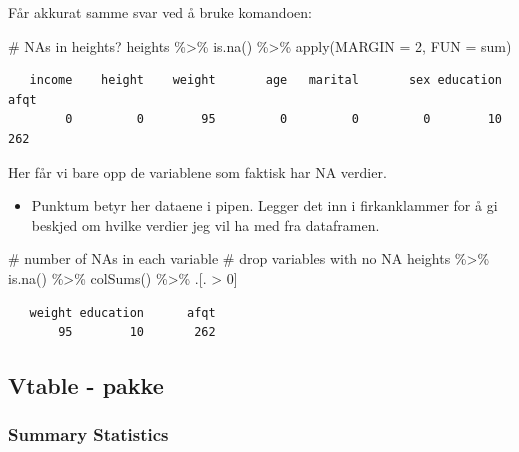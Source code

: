 \documentclass[
  letterpaper,
  DIV=11,
  numbers=noendperiod]{scrartcl}
\newenvironment{Shaded}{\begin{snugshade}}{\end{snugshade}}
\newcommand{\AttributeTok}[1]{\textcolor[rgb]{0.40,0.45,0.13}{#1}}
\newcommand{\CommentTok}[1]{\textcolor[rgb]{0.37,0.37,0.37}{#1}}
\newcommand{\DecValTok}[1]{\textcolor[rgb]{0.68,0.00,0.00}{#1}}
\newcommand{\FunctionTok}[1]{\textcolor[rgb]{0.28,0.35,0.67}{#1}}
\newcommand{\NormalTok}[1]{\textcolor[rgb]{0.00,0.23,0.31}{#1}}
\newcommand{\SpecialCharTok}[1]{\textcolor[rgb]{0.37,0.37,0.37}{#1}}
\providecommand{\tightlist}{%
  \setlength{\itemsep}{0pt}\setlength{\parskip}{0pt}}\usepackage{longtable,booktabs,array}
\begin{document}
Får akkurat samme svar ved å bruke komandoen:

\begin{Shaded}
\begin{Highlighting}[]
\CommentTok{\# NAs in heights?}
\NormalTok{heights }\SpecialCharTok{\%\textgreater{}\%} 
  \FunctionTok{is.na}\NormalTok{() }\SpecialCharTok{\%\textgreater{}\%} 
  \FunctionTok{apply}\NormalTok{(}\AttributeTok{MARGIN =} \DecValTok{2}\NormalTok{, }\AttributeTok{FUN =}\NormalTok{ sum) }
\end{Highlighting}
\end{Shaded}

\begin{verbatim}
   income    height    weight       age   marital       sex education      afqt 
        0         0        95         0         0         0        10       262 
\end{verbatim}

Her får vi bare opp de variablene som faktisk har NA verdier.

\begin{itemize}
\tightlist
\item
  Punktum betyr her dataene i pipen. Legger det inn i firkanklammer for
  å gi beskjed om hvilke verdier jeg vil ha med fra dataframen.
\end{itemize}

\begin{Shaded}
\begin{Highlighting}[]
\CommentTok{\# number of NAs in each variable}
\CommentTok{\# drop variables with no NA}
\NormalTok{heights }\SpecialCharTok{\%\textgreater{}\%} 
  \FunctionTok{is.na}\NormalTok{() }\SpecialCharTok{\%\textgreater{}\%} 
  \FunctionTok{colSums}\NormalTok{() }\SpecialCharTok{\%\textgreater{}\%} 
\NormalTok{  .[. }\SpecialCharTok{\textgreater{}} \DecValTok{0}\NormalTok{]}
\end{Highlighting}
\end{Shaded}

\begin{verbatim}
   weight education      afqt 
       95        10       262 
\end{verbatim}

\hypertarget{vtable---pakke}{%
\subsection{Vtable - pakke}\label{vtable---pakke}}

\hypertarget{summary-statistics}{%
\subsubsection{Summary Statistics}\label{summary-statistics}}
\end{document}

